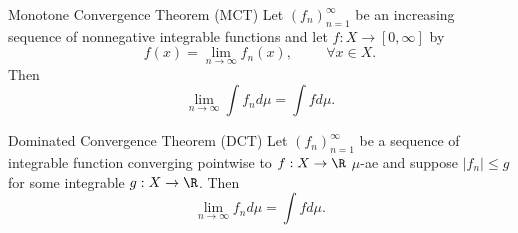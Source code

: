 \documentclass[stat901]{subfiles}
\begin{document}
    \rruleline

    \begin{theorem}{Monotone Convergence Theorem (MCT)}
        Let $\left( f_{n} \right)^{\infty}_{n=1}$ be an increasing sequence of nonnegative integrable functions and let $f:X\to\left[ 0,\infty \right]$ by
        \begin{equation*}
            f\left( x \right) = \lim_{n\to\infty}f_n\left( x \right),\hspace{1cm}\forall x\in X.
        \end{equation*}
        Then
        \begin{equation*}
            \lim_{n\to\infty} \int f_nd\mu = \int fd\mu.
        \end{equation*}
    \end{theorem}

    \rruleline

    \begin{theorem}{Dominated Convergence Theorem (DCT)}
        Let $\left( f_{n} \right)^{\infty}_{n=1}$ be a sequence of integrable function converging pointwise to $f:X\to\R$ $\mu$-ae and suppose $\left| f_n \right|\leq g$ for some integrable $g:X\to\R$. Then
        \begin{equation*}
            \lim_{n\to\infty} f_nd\mu = \int fd\mu.
        \end{equation*}
    \end{theorem}

    \rruleline
    
\end{document}
